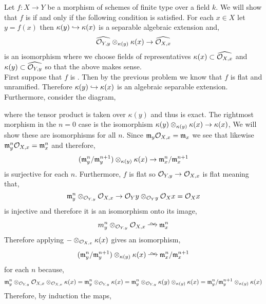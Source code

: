 \documentclass[12pt]{article}
\begin{document}
Let $f : X \to Y$ be a morphism of schemes of finite type over a field $k$. We will show that $f$ is \etale if and only if the following condition is satisfied. For each $x \in X$ let $y = f(x)$ then $\kappa(y) \hookrightarrow \kappa(x)$ is a separable algebraic extension and,
\[ \widehat{\mathcal{O}_{Y, y}} \otimes_{\kappa(y)} \kappa(x) \to \widehat{\mathcal{O}_{X, x}} \]
is an isomorphism where we choose fields of representatives $\kappa(x) \subset \widehat{\mathcal{O}_{X, x}}$ and $\kappa(y) \subset \widehat{\mathcal{O}_{Y, y}}$ so that the above makes sense.
\bigskip\\
First suppose that $f$ is \etale. Then by the previous problem we know that $f$ is flat and unramified. Therefore $\kappa(y) \hookrightarrow \kappa(x)$ is an algebraic separable extension. Furthermore, consider the diagram, 
\begin{center}
\end{center}
where the tensor product is taken over $\kappa(y)$ and thus is exact. The rightmost morphism in the $n = 0$ case is the isomorphism $\kappa(y) \otimes_{\kappa(y)} \kappa(x) \to \kappa(x)$, We will show these are isomorphisms for all $n$. Since $\mathfrak{m}_y \mathcal{O}_{X, x} = \mathfrak{m}_x$ we see that likewise $\mathfrak{m}_y^n \mathcal{O}_{X, x} = \mathfrak{m}_x^n$ and therefore,
\[ (\mathfrak{m}_y^n / \mathfrak{m}_y^{n+1}) \otimes_{\kappa(y)} \kappa(x) \to \mathfrak{m}_x^n / \mathfrak{m}_x^{n+1} \]
is surjective for each $n$. Furthermore, $f$ is flat so $\mathcal{O}_{Y, y} \to \mathcal{O}_{X, x}$ is flat meaning that,
\[ \mathfrak{m}_y^n \otimes_{\mathcal{O}_{Y, y}} \mathcal{O}_{X, x} \to \mathcal{O}_{Y}{y} \otimes_{\mathcal{O}_{Y}{y}} \mathcal{O}_{X}{x} = \mathcal{O}_{X}{x} \]
is injective and therefore it is an isomorphism onto its image,
\[ m_y^n \ot_{\stalk{Y}{y}} \stalk{X}{x} \iso \m_x^n \]
Therefore applying $- \otimes_{\mathcal{O}_{X, x}} \kappa(x)$ gives an isomorphism,
\[ (\m_y^n / \m_y^{n+1}) \ot_{\kappa(y)} \kappa(x) \iso \m_x^n / \m_x^{n+1} \]
for each $n$ because,
\[ \mathfrak{m}_y^n \otimes_{\mathcal{O}_{Y, y}} \mathcal{O}_{X, x} \otimes_{\mathcal{O}_{X, x}} \kappa(x) = \mathfrak{m}_y^n \otimes_{\mathcal{O}_{Y, y}} \kappa(x) = \mathfrak{m}_y^n \otimes_{\mathcal{O}_{Y, y}} \kappa(y) \otimes_{\kappa(y)} \kappa(x) = \mathfrak{m}_y^n / \mathfrak{m}_y^{n+1} \otimes_{\kappa(y)} \kappa(x) \]
Therefore, by induction the maps,
\end{document}
